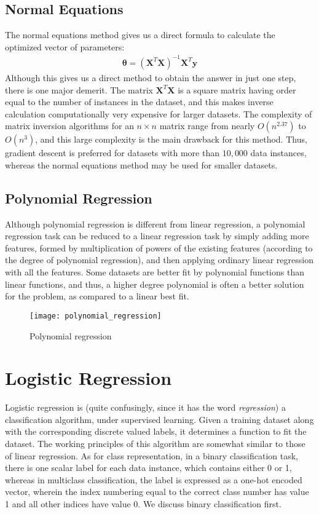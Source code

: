 \documentclass[a4paper, 12pt]{report}
\begin{document}
\section{Normal Equations}
The normal equations method gives us a direct formula to calculate the optimized vector of parameters:
\begin{align*}
\bm{\theta} = \left(\bm{X}^T\bm{X}\right)^{-1}\bm{X}^T\bm{y}
\end{align*}
Although this gives us a direct method to obtain the answer in just one step, there is one major demerit. The matrix $\bm{X}^T\bm{X}$ is a square matrix having order equal to the number of instances in the dataset, and this makes inverse calculation computationally very expensive for larger datasets. The complexity of matrix inversion algorithms for an $n\times n$ matrix range from nearly $O(n^{2.37})$ to $O(n^3)$, and this large complexity is the main drawback for this method. Thus, gradient descent is preferred for datasets with more than $10,000$ data instances, whereas the normal equations method may be used for smaller datasets.

\section{Polynomial Regression}
Although polynomial regression is different from linear regression, a polynomial regression task can be reduced to a linear regression task by simply adding more features, formed by multiplication of powers of the existing features (according to the degree of polynomial regression), and then applying ordinary linear regression with all the features. Some datasets are better fit by polynomial functions than linear functions, and thus, a higher degree polynomial is often a better solution for the problem, as compared to a linear best fit.
\begin{figure}[H]
\centering
\texttt{[image: polynomial\_regression]}
\caption{Polynomial regression}
\end{figure}

\newpage

\chapter{Logistic Regression}
Logistic regression is (quite confusingly, since it has the word \textit{regression}) a classification algorithm, under supervised learning. Given a training dataset along with the corresponding discrete valued labels, it determines a function to fit the dataset. The working principles of this algorithm are somewhat similar to those of linear regression. As for class representation, in a binary classification task, there is one scalar label for each data instance, which contains either 0 or 1, whereas in multiclass classification, the label is expressed as a one-hot encoded vector, wherein the index numbering equal to the correct class number has value 1 and all other indices have value 0. We discuss binary classification first.
\end{document}
